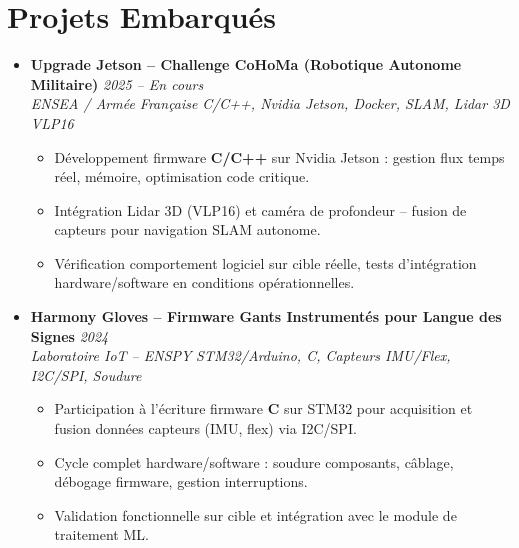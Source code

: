 \documentclass[a4paper,11pt]{article}
\begin{document}
\section{Projets Embarqués}
\begin{itemize}[leftmargin=*, label={-}]

\item \textbf{Upgrade Jetson -- Challenge CoHoMa (Robotique Autonome Militaire)} \hfill \textit{2025 -- En cours} \\
\textit{ENSEA / Armée Française} \hfill \textit{C/C++, Nvidia Jetson, Docker, SLAM, Lidar 3D VLP16}
\vspace{-2pt}
    \begin{itemize}[leftmargin=0.4cm, nosep, label=\tiny$\bullet$]
        \item \small{Développement firmware \textbf{C/C++} sur Nvidia Jetson : gestion flux temps réel, mémoire, optimisation code critique.}
        \item \small{Intégration Lidar 3D (VLP16) et caméra de profondeur -- fusion de capteurs pour navigation SLAM autonome.}
        \item \small{Vérification comportement logiciel sur cible réelle, tests d'intégration hardware/software en conditions opérationnelles.}
    \end{itemize}
\vspace{3pt}

\item \textbf{Harmony Gloves -- Firmware Gants Instrumentés pour Langue des Signes} \hfill \textit{2024} \\
\textit{Laboratoire IoT -- ENSPY} \hfill \textit{STM32/Arduino, C, Capteurs IMU/Flex, I2C/SPI, Soudure}
\vspace{-2pt}
    \begin{itemize}[leftmargin=0.4cm, nosep, label=\tiny$\bullet$]
        \item \small{Participation à l'écriture firmware \textbf{C} sur STM32 pour acquisition et fusion données capteurs (IMU, flex) via I2C/SPI.}
        \item \small{Cycle complet hardware/software : soudure composants, câblage, débogage firmware, gestion interruptions.}
        \item \small{Validation fonctionnelle sur cible et intégration avec le module de traitement ML.}
    \end{itemize}
\vspace{3pt}


\end{itemize}
\end{document}
